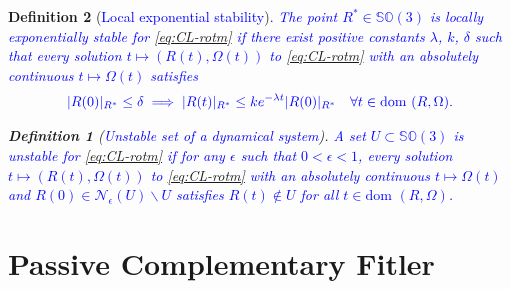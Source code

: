 \documentclass{article}
\newcommand{\dom}{\text{dom }}
\newcommand{\SOthree}{\mathbb{SO}(3)}
\newtheorem{definition}{Definition}
\newcommand{\textblue}[1]{\textcolor{blue}{#1}}
\newcommand{\Rtilde}{\tilde{R}}
\newcommand{\normSOthree}[1]{{{\vert}#1 {\vert}_I}}
\newcommand{\expo}[1]{e^{#1}}
\newcommand{\Rstar}{{R^*}}
\newcommand{\neighbourhood}[2]{\mathcal{N}_{#1}(#2)}
\begin{document}
\begin{definition}[\textblue{Local exponential stability}]\label{def:local_lyap_stab}
\textblue{The point $\Rstar\in\SOthree$ is locally exponentially stable {for \eqref{eq:CL-rotm}} if there exist positive constants $\lambda$, $k$, $\delta$ such that every solution $t\mapsto (R(t), \Omega(t))$ {to \eqref{eq:CL-rotm}} with an absolutely continuous $t\mapsto \Omega(t)$ satisfies}
\begin{align*}
    \textblue{|R(0)|_{\Rstar}\leq \delta \implies |R(t)|_{\Rstar} \leq  k\expo{-\lambda t} |R(0)|_{\Rstar} \quad \forall t \in \dom{(R,\Omega)}.}
\end{align*}

\begin{definition}[\textblue{Unstable set of a dynamical system}] \textblue{A set $U\subset \SOthree$ is unstable for \eqref{eq:CL-rotm} if for any $\epsilon$ such that $0 < \epsilon < 1$, every solution $t\mapsto (R(t),\Omega(t))$ to \eqref{eq:CL-rotm} with an absolutely continuous $t\mapsto \Omega(t)$ and $R(0) \in \neighbourhood{\epsilon}{U}\backslash U$ satisfies $R(t)\notin U$ for all $t\in \dom{(R,\Omega)}$.  }
    
\end{definition}





\end{definition}


\section{Passive Complementary Fitler}
\end{document}

